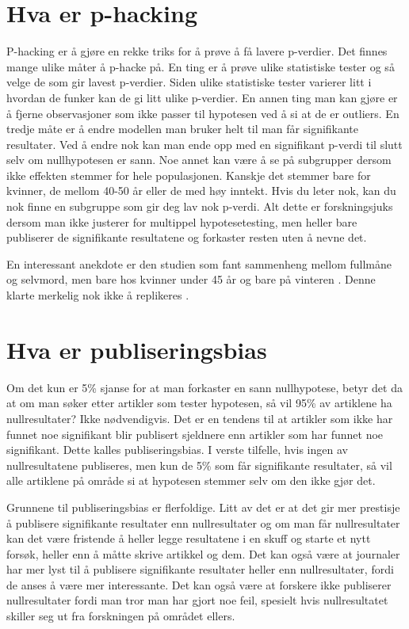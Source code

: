 \documentclass[doc,norsk]{apa7}
\begin{document}
\section{Hva er p-hacking}
P-hacking er å gjøre en rekke triks for å prøve å få lavere p-verdier. Det finnes mange ulike måter å p-hacke på. En ting er å prøve ulike statistiske tester og så velge de som gir lavest p-verdier. Siden ulike statistiske tester varierer litt i hvordan de funker kan de gi litt ulike p-verdier. En annen ting man kan gjøre er å fjerne observasjoner som ikke passer til hypotesen ved å si at de er outliers. En tredje måte er å endre modellen man bruker helt til man får signifikante resultater. Ved å endre nok kan man ende opp med en signifikant p-verdi til slutt selv om nullhypotesen er sann. Noe annet kan være å se på subgrupper dersom ikke effekten stemmer for hele populasjonen. Kanskje det stemmer bare for kvinner, de mellom 40-50 år eller de med høy inntekt. Hvis du leter nok, kan du nok finne en subgruppe som gir deg lav nok p-verdi. Alt dette er forskningsjuks dersom man ikke justerer for multippel hypotesetesting, men heller bare publiserer de signifikante resultatene og forkaster resten uten å nevne det.

En interessant anekdote er den studien som fant sammenheng mellom fullmåne og selvmord, men bare hos kvinner under 45 år og bare på vinteren \parencite{selvmord-vinter-2}. Denne klarte merkelig nok ikke å replikeres \parencite{selvmord-vinter}.

\section{Hva er publiseringsbias}
Om det kun er 5\% sjanse for at man forkaster en sann nullhypotese, betyr det da at om man søker etter artikler som tester hypotesen, så vil 95\% av artiklene ha nullresultater? Ikke nødvendigvis. Det er en tendens til at artikler som ikke har funnet noe signifikant blir publisert sjeldnere enn artikler som har funnet noe signifikant. Dette kalles publiseringsbias. I verste tilfelle, hvis ingen av nullresultatene publiseres, men kun de 5\% som får signifikante resultater, så vil alle artiklene på område si at hypotesen stemmer selv om den ikke gjør det.

Grunnene til publiseringsbias er flerfoldige. Litt av det er at det gir mer prestisje å publisere signifikante resultater enn nullresultater og om man får nullresultater kan det være fristende å heller legge resultatene i en skuff og starte et nytt forsøk, heller enn å måtte skrive artikkel og  dem. Det kan også være at journaler har mer lyst til å publisere signifikante resultater heller enn nullresultater, fordi de anses å være mer interessante. Det kan også være at forskere ikke publiserer nullresultater fordi man tror man har gjort noe feil, spesielt hvis nullresultatet skiller seg ut fra forskningen på området ellers.
\end{document}

